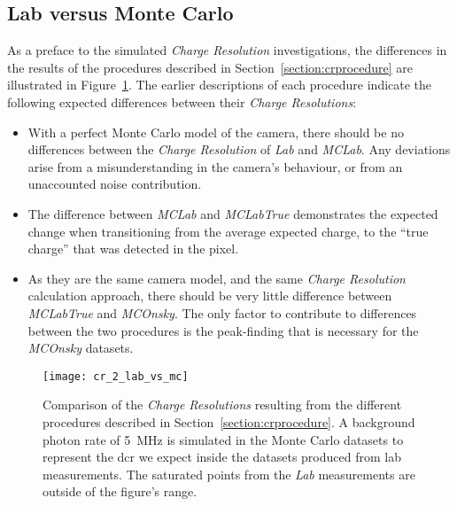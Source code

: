 \subsection{Lab versus Monte Carlo} \label{section:labvsmc}

As a preface to the simulated \textit{Charge Resolution} investigations, the differences in the results of the procedures described in Section~\ref{section:crprocedure} are illustrated in Figure~\ref{fig:cr_2_lab_vs_mc}. The earlier descriptions of each procedure indicate the following expected differences between their \textit{Charge Resolutions}:
\begin{itemize}
\item With a perfect Monte Carlo model of the camera, there should be no differences between the \textit{Charge Resolution} of \textit{Lab} and \textit{MCLab}. Any deviations arise from a misunderstanding in the camera's behaviour, or from an unaccounted noise contribution.
\item The difference between \textit{MCLab} and \textit{MCLabTrue} demonstrates the expected change when transitioning from the average expected charge, to the ``true charge'' that was detected in the pixel.
\item As they are the same camera model, and the same \textit{Charge Resolution} calculation approach, there should be very little difference between \textit{MCLabTrue} and \textit{MCOnsky}. The only factor to contribute to differences between the two procedures is the peak-finding that is necessary for the \textit{MCOnsky} datasets.
\end{itemize}

\begin{figure}[H]
	\centering
    \texttt{[image: cr\_2\_lab\_vs\_mc]} 
	\caption[Comparison of the different \textit{Charge Resolution} procedures.]{Comparison of the \textit{Charge Resolutions} resulting from the different procedures described in Section~\ref{section:crprocedure}. A background photon rate of \SI{5}{MHz} is simulated in the Monte Carlo datasets to represent the \gls{dcr} we expect inside the datasets produced from lab measurements. The saturated points from the \textit{Lab} measurements are outside of the figure's range.}
	\label{fig:cr_2_lab_vs_mc}
\end{figure}

